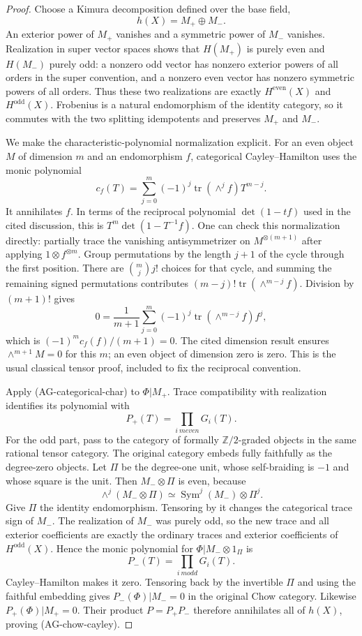 \begin{proof}
Choose a Kimura decomposition defined over the base
field,
\[
                   h(X)=M_+\oplus M_-.
\]
An exterior power of $M_+$ vanishes and a symmetric
power of $M_-$ vanishes.  Realization in super vector
spaces shows that $H(M_+)$ is purely even and
$H(M_-)$ purely odd: a nonzero odd vector has
nonzero exterior powers of all orders in the super
convention, and a nonzero even vector has nonzero
symmetric powers of all orders.  Thus these two
realizations are exactly $H^{\mathrm{even}}(X)$ and
$H^{\mathrm{odd}}(X)$.  Frobenius is a natural
endomorphism of the identity category, so it
commutes with the two splitting idempotents and
preserves $M_+$ and $M_-$.

We make the characteristic-polynomial normalization
explicit.  For an even object $M$ of dimension $m$
and an endomorphism $f$, categorical Cayley--Hamilton
uses the monic polynomial
\[
 c_f(T)=\sum_{j=0}^m(-1)^j
                 \operatorname{tr}(\wedge^j f)T^{m-j}.
\tag{AG-categorical-char}
\]
It annihilates $f$.  In terms of the reciprocal
polynomial $\det(1-tf)$ used in the cited discussion,
this is $T^m\det(1-T^{-1}f)$.
One can check this normalization directly: partially
trace the vanishing antisymmetrizer on $M^{\otimes(m+1)}$
after applying $1\otimes f^{\otimes m}$.  Group
permutations by the length $j+1$ of the cycle through
the first position.  There are
${m\choose j}j!$ choices for that cycle, and summing
the remaining signed permutations contributes
$(m-j)!\operatorname{tr}(\wedge^{m-j}f)$.
Division by $(m+1)!$ gives
\[
 0=\frac1{m+1}\sum_{j=0}^m(-1)^j
                  \operatorname{tr}(\wedge^{m-j}f)f^j,
\]
which is $(-1)^mc_f(f)/(m+1)=0$.
The cited dimension result ensures
$\wedge^{m+1}M=0$ for this $m$; an even object of
dimension zero is zero.  This is the usual classical
tensor proof, included to fix the reciprocal convention.

Apply (AG-categorical-char) to $\Phi|M_+$.
Trace compatibility with realization identifies its
polynomial with
\[
                         P_+(T)=\prod_{i\ {
m even}}G_i(T).
\]
For the odd part, pass to the category of formally
$\mathbb Z/2$-graded objects in the same rational
tensor category.  The original category embeds
fully faithfully as the degree-zero objects.
Let $\Pi$ be the degree-one unit, whose self-braiding
is $-1$ and whose square is the unit.
Then $M_-\otimes\Pi$ is even, because
\[
 \wedge^j(M_-\otimes\Pi)
              \simeq \operatorname{Sym}^j(M_-)\otimes\Pi^j.
\]
Give $\Pi$ the identity endomorphism.  Tensoring by
it changes the categorical trace sign of $M_-$.
The realization of $M_-$ was purely odd, so the
new trace and all exterior coefficients are exactly
the ordinary traces and exterior coefficients of
$H^{\mathrm{odd}}(X)$.  Hence the monic polynomial
for $\Phi|M_-\otimes1_\Pi$ is
\[
                         P_-(T)=\prod_{i\ {
m odd}}G_i(T).
\]
Cayley--Hamilton makes it zero.  Tensoring back by
the invertible $\Pi$ and using the faithful embedding
gives $P_-(\Phi)|M_-=0$ in the original Chow category.
Likewise $P_+(\Phi)|M_+=0$.  Their product
$P=P_+P_-$ therefore annihilates all of $h(X)$,
proving (AG-chow-cayley).


\end{proof}
